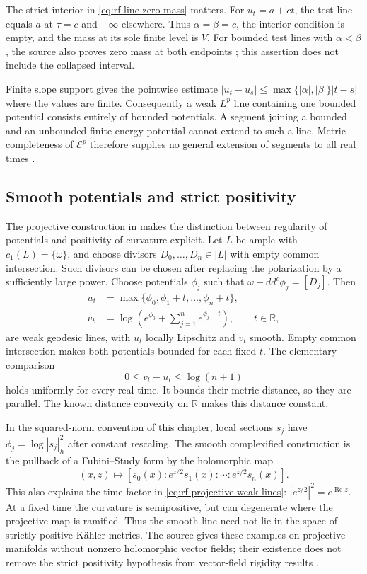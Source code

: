 The strict interior in \eqref{eq:rf-line-zero-mass} matters.
For $u_t=a+ct$, the test line equals $a$ at $\tau=c$ and
$-\infty$ elsewhere. Thus $\alpha=\beta=c$, the interior
condition is empty, and the mass at its sole finite level is $V$.
For bounded test lines with $\alpha<\beta$, the source also
proves zero mass at both endpoints
\cite[Remark~4.2]{DarvasMcCleerey26Lines}; this assertion does
not include the collapsed interval.

Finite slope support gives the pointwise estimate
$|u_t-u_s|\leq\max\{|\alpha|,|\beta|\}|t-s|$
where the values are finite. Consequently a weak $L^p$ line
containing one bounded potential consists entirely of bounded
potentials. A segment joining a bounded and an unbounded
finite-energy potential cannot extend to such a line.
Metric completeness of $\mathcal E^p$ therefore supplies no
general extension of segments to all real times
\cite[Section~1; proof of Theorem~4.1]{DarvasMcCleerey26Lines}.

\subsection{Smooth potentials and strict positivity}

The projective construction in
\cite[Corollary~5.2]{DarvasMcCleerey26Lines} makes the distinction
between regularity of potentials and positivity of curvature explicit.
Let $L$ be ample with $c_1(L)=\{\omega\}$, and choose divisors
$D_0,\ldots,D_n\in|L|$ with empty common intersection.
Such divisors can be chosen after replacing the polarization
by a sufficiently large power. Choose potentials $\phi_j$
such that $\omega+dd^c\phi_j=[D_j]$. Then
\[
\tag{65.52}\label{eq:rf-projective-weak-lines}
 \begin{split}
 u_t&=\max\{\phi_0,\phi_1+t,\ldots,\phi_n+t\},\\
 v_t&=\log\left(e^{\phi_0}+\sum_{j=1}^n e^{\phi_j+t}\right),
 \qquad t\in\mathbb R,
 \end{split}
\]
are weak geodesic lines, with $u_t$ locally Lipschitz and
$v_t$ smooth. Empty common intersection makes both
potentials bounded for each fixed $t$.
The elementary comparison
\[
             0\leq v_t-u_t\leq\log(n+1)
\]
holds uniformly for every real time. It bounds their metric
distance, so they are parallel. The known distance convexity
on $\mathbb R$ makes this distance constant.

In the squared-norm convention of this chapter, local sections
$s_j$ have $\phi_j=\log|s_j|_h^2$ after constant rescaling.
The smooth complexified construction is the pullback of a
Fubini--Study form by the holomorphic map
\[
 (x,z)\longmapsto[s_0(x):e^{z/2}s_1(x):\cdots:e^{z/2}s_n(x)].
\]
This also explains the time factor in \eqref{eq:rf-projective-weak-lines}:
$|e^{z/2}|^2=e^{\operatorname{Re}z}$.
At a fixed time the curvature is semipositive, but can
degenerate where the projective map is ramified. Thus the
smooth line need not lie in the space of strictly positive
K\"ahler metrics. The source gives these examples on
projective manifolds without nonzero holomorphic vector fields;
their existence does not remove the strict positivity hypothesis
from vector-field rigidity results
\cite[Remark~1.5; Corollary~5.2 and its discussion]{DarvasMcCleerey26Lines}.

